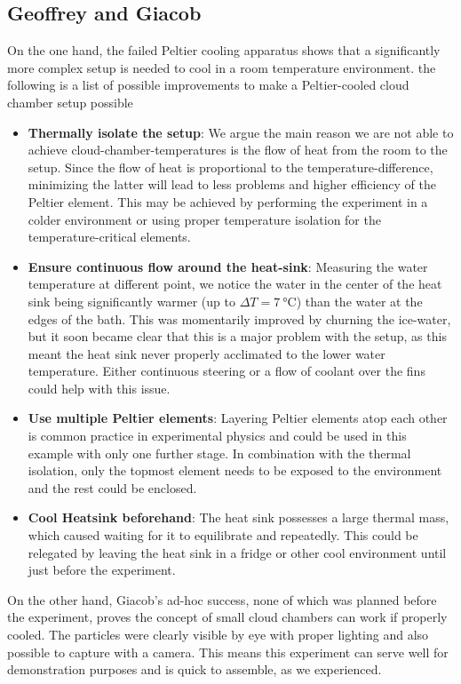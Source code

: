 \documentclass[10pt,a4paper]{article}
\begin{document}
\subsection{Geoffrey and Giacob}
On the one hand, the failed Peltier cooling apparatus shows that a significantly more complex setup is needed to cool in a room temperature environment. the following is a list of possible improvements to make a Peltier-cooled cloud chamber setup possible
\begin{itemize}

    \item \textbf{Thermally isolate the setup}: We argue the main reason we are not able to achieve cloud-chamber-temperatures is the flow of heat from the room to the setup. Since the flow of heat is proportional to the temperature-difference, minimizing the latter will lead to less problems and higher efficiency of the Peltier element. This may be achieved by performing the experiment in a colder environment or using proper temperature isolation for the temperature-critical elements.
    \item \textbf{Ensure continuous flow around the heat-sink}: Measuring the water temperature at different point, we notice the water in the center of the heat sink being significantly warmer (up to $\Delta T = \qty{7}{\celsius}$) than the water at the edges of the bath. This was momentarily improved by churning the ice-water, but it soon became clear that this is a major problem with the setup, as this meant the heat sink never properly acclimated to the lower water temperature. Either continuous steering or a flow of coolant over the fins could help with this issue.
    \item \textbf{Use multiple Peltier elements}: Layering Peltier elements atop each other is common practice in experimental physics and could be used in this example with only one further stage. In combination with the thermal isolation, only the topmost element needs to be exposed to the environment and the rest could be enclosed. 
    \item \textbf{Cool Heatsink beforehand}: The heat sink possesses a large thermal mass, which caused waiting for it to equilibrate and repeatedly. This could be relegated by leaving the heat sink in a fridge or other cool environment until just before the experiment. 
\end{itemize}

On the other hand, Giacob's ad-hoc success, none of which was planned before the experiment, proves the concept of small cloud chambers can work if properly cooled. The particles were clearly visible by eye with  proper lighting and also possible to capture with a camera. This means this experiment can serve well for demonstration purposes and is quick to assemble, as we experienced.
\end{document}
